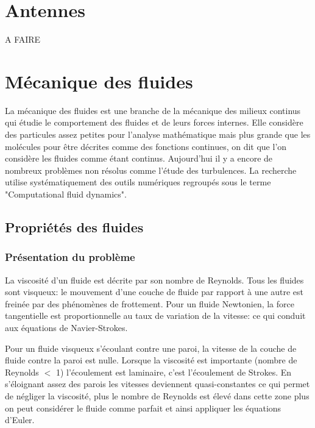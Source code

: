 \documentclass[10pt,a4paper]{article}
\begin{document}
\section{Antennes}
A FAIRE



\section{Mécanique des fluides}
La mécanique des fluides est une branche de la mécanique des milieux continus qui étudie le comportement des fluides et de leurs forces internes. Elle considère des particules assez petites pour l'analyse mathématique mais plus grande que les molécules pour être décrites comme des fonctions continues, on dit que l'on considère les fluides comme étant continus. Aujourd'hui il y a encore de nombreux problèmes non résolus comme l'étude des turbulences. La recherche utilise systématiquement des outils numériques regroupés sous le terme "Computational fluid dynamics".

\subsection{Propriétés des fluides}
\subsubsection{Présentation du problème \cite{intromecaflu}}
La viscosité d'un fluide est décrite par son nombre de Reynolds\cite{nbreynolds}. Tous les fluides sont visqueux: le mouvement d'une couche de fluide par rapport à une autre est freinée par des phénomènes de frottement. Pour un fluide Newtonien, la force tangentielle est proportionnelle au taux de variation de la vitesse: ce qui conduit aux équations de Navier-Strokes.

Pour un fluide visqueux s'écoulant contre une paroi, la vitesse de la couche de fluide contre la paroi est nulle. Lorsque la viscosité est importante (nombre de Reynolds $<$ 1) l'écoulement est laminaire, c'est l'écoulement de Strokes. En s'éloignant assez des parois les vitesses deviennent quasi-constantes ce qui permet de négliger la viscosité, plus le nombre de Reynolds est élevé dans cette zone plus on peut considérer le fluide comme parfait et ainsi appliquer les équations d'Euler.
\end{document}
